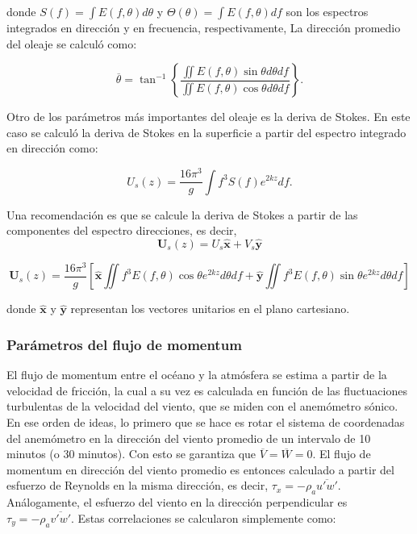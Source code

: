 \documentclass[11pt]{article}
\begin{document}
donde $S(f)=\int{E(f, \theta)} d\theta$ y $\Theta(\theta) = \int{E(f,\theta)}
df$ son los espectros integrados en dirección y en frecuencia, respectivamente,
La dirección promedio del oleaje se calculó como:

\begin{equation}
  \overline{\theta} = \tan^{-1} \left\{ \frac{
                 {\displaystyle \iint E(f,\theta)\sin\theta} d\theta df}
                {{\displaystyle \iint E(f,\theta)\cos\theta } d\theta df}
                         \right\}.
\end{equation}

Otro de los parámetros más importantes del oleaje es la deriva de Stokes. En
este caso se calculó la deriva de Stokes en la superficie a partir del espectro
integrado en dirección como:

\begin{equation}
  U_{s}(z) = \frac{16 \pi^3}{g} \int f^3 S(f) e^{2kz} df.
\end{equation}

Una recomendación es que se calcule la deriva de Stokes a partir de las
componentes del espectro direcciones, es decir,
\begin{equation}
  \mathbf{U}_{s}(z) = U_s \mathbf{\hat{x}} + V_s \mathbf{\hat{y}}
\end{equation}

\begin{equation}
  \mathbf{U}_{s}(z) = \frac{16 \pi^3}{g} \left[
    \mathbf{\hat{x}} {\displaystyle \iint f^3 E(f,\theta)\cos\theta } e^{2kz} d\theta df + 
    \mathbf{\hat{y}} {\displaystyle \iint f^3 E(f,\theta)\sin\theta } e^{2kz} d\theta df
  \right]
\end{equation}

donde $\mathbf{\hat{x}}$ y $\mathbf{\hat{y}}$ representan los vectores unitarios
en el plano cartesiano.


\subsubsection*{Parámetros del flujo de momentum}%
\label{ssub:parametros_del_flujo_de_momentum}

El flujo de momentum entre el océano y la atmósfera se estima a partir de la
velocidad de fricción, la cual a su vez es calculada en función de las
fluctuaciones turbulentas de la velocidad del viento, que se miden con el
anemómetro sónico. En ese orden de ideas, lo primero que se hace es rotar el
sistema de coordenadas del anemómetro en la dirección del viento promedio de un
intervalo de 10 minutos (o 30 minutos). Con esto se garantiza que
$\overline{V}=\overline{W}=0$. El flujo de momentum en dirección del viento
promedio es entonces calculado a partir del esfuerzo de Reynolds en la misma
dirección, es decir, $\tau_x = -\rho_a \overline{u'w'}$. Análogamente, el
esfuerzo del viento en la dirección perpendicular es $\tau_y = -\rho_a
\overline{v'w'}$. Estas correlaciones se calcularon simplemente como:
\end{document}
